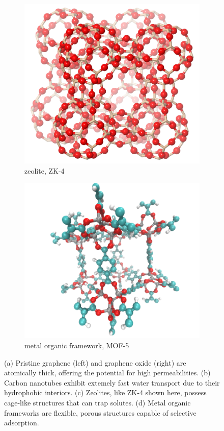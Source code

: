 \begin{figure}
  \begin{subfigure}{0.45\textwidth} %
  \includegraphics[width=\textwidth]{figs/zeolite.png}
  \caption{zeolite, ZK-4}\label{fig:zeolite}
  \end{subfigure}
  \begin{subfigure}{0.45\textwidth}
  \includegraphics[width=\textwidth]{figs/mof.png}
  \caption{metal organic framework, MOF-5}\label{fig:mof}
  \end{subfigure}
  \caption{(a) Pristine graphene (left) and graphene oxide (right) are atomically thick,
  offering the potential for high permeabilities. (b) Carbon nanotubes exhibit extemely
  fast water transport due to their hydrophobic interiors. (c) Zeolites, like ZK-4 
  shown here, possess cage-like structures that can trap solutes. (d) Metal organic
  frameworks are flexible, porous structures capable of selective adsorption. }\label{fig:nanostructured_materials}
  \end{figure}

